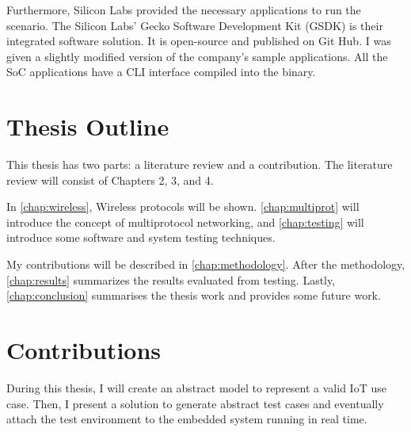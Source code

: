Furthermore, Silicon Labs provided the necessary applications to run the scenario. The Silicon Labs' Gecko Software Development Kit (GSDK) is their integrated software solution. It is open-source and published on Git Hub\cite{silabs_gsdk:2023}. I was given a slightly modified version of the company's sample applications. All the SoC applications have a CLI interface compiled into the binary.

\section{Thesis Outline}

This thesis has two parts: a literature review and a contribution. The literature review will consist of Chapters 2, 3, and 4.

In \autoref{chap:wireless}, Wireless protocols will be shown.
\autoref{chap:multiprot} will introduce the concept of multiprotocol networking, and \autoref{chap:testing} will introduce some software and system testing techniques.

My contributions will be described in \autoref{chap:methodology}. After the methodology, \autoref{chap:results} summarizes the results evaluated from testing. Lastly, \autoref{chap:conclusion} summarises the thesis work and provides some future work.



\section{Contributions}
During this thesis, I will create an abstract model to represent a valid IoT use case. Then, I present a solution to generate abstract test cases and eventually attach the test environment to the embedded system running in real time.